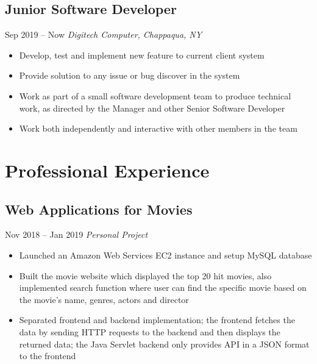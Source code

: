 \documentclass[11pt, letterpaper]{article} %
\begin{document}
\subsection{Junior Software Developer}
\hspace*{\fill}Sep 2019 -- Now
\linebreak
\vspace{-0.8em}
\textit{Digitech Computer, Chappaqua, NY}
\begin{itemize}
	\setlength\itemsep{-0.5em}
	\item Develop, test and implement new feature to current client system
	\item Provide solution to any issue or bug discover in the system
	\item Work as part of a small software development team to produce technical work, as directed by the Manager and other Senior Software Developer
	\item Work both independently and interactive with other members in the team
\end{itemize}

\vspace{0.5em}
\section{Professional Experience}
\subsection{Web Applications for Movies}
\hspace*{\fill}Nov 2018 -- Jan 2019
\linebreak
\vspace{-0.7em}
\textit{Personal Project}
\begin{itemize}
	\setlength\itemsep{-0.5em}
	\item Launched an Amazon Web Services EC2 instance and setup MySQL database
	\item Built the movie website which displayed the top 20 hit movies, also implemented search function where user can find the specific movie based on the movie's name, genres, actors and director
	\item Separated frontend and backend implementation; the frontend fetches the data by sending HTTP requests to the backend and then displays the returned data; the Java Servlet backend only provides API in a JSON format to the frontend
\end{itemize}
\vspace{-0.5em}
\end{document}
